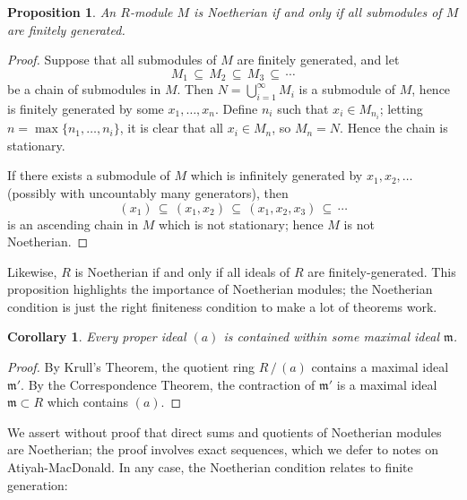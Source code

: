 \documentclass[11pt]{article}
\newtheorem{proposition}{Proposition}
\newtheorem{corollary}{Corollary}
\begin{document}
\begin{adjustwidth}{0.5cm}{}
  \begin{proposition}
    An $R$-module $M$ is Noetherian if and only if all submodules of $M$ are finitely generated.
  \end{proposition}
  \begin{proof}
    Suppose that all submodules of $M$ are finitely generated, and let 
    \[
      M_{1} \, \subseteq \, M_{2} \, \subseteq \, M_{3} \, \subseteq \, \cdots
    \]
    be a chain of submodules in $M$. Then $N = \bigcup_{i = 1}^{\infty} M_{i}$ is a submodule of $M$, hence is finitely generated by some $x_{1}, \ldots, x_{n}$. Define $n_{i}$ such that $x_{i} \in M_{n_{i}}$; letting $n = \max\{ n_{1}, \ldots, n_{i} \}$, it is clear that all $x_{i} \in M_{n}$, so $M_{n} = N$. Hence the chain is stationary.

    If there exists a submodule of $M$ which is infinitely generated by $x_{1}, x_{2}, \ldots$ (possibly with uncountably many generators), then
    \[
      (x_{1}) \, \subseteq \, (x_{1}, x_{2}) \, \subseteq \, (x_{1}, x_{2}, x_{3}) \, \subseteq \, \cdots
    \]
    is an ascending chain in $M$ which is not stationary; hence $M$ is not Noetherian.
  \end{proof}
\end{adjustwidth}

Likewise, $R$ is Noetherian if and only if all ideals of $R$ are finitely-generated. This proposition highlights the importance of Noetherian modules; the Noetherian condition is just the right finiteness condition to make a lot of theorems work.

\begin{adjustwidth}{0.5cm}{}
  \begin{corollary}
    Every proper ideal $(a)$ is contained within some maximal ideal $\mathfrak{m}$.
  \end{corollary}
  \begin{proof}
    By Krull's Theorem, the quotient ring $R \, / \, (a)$ contains a maximal ideal $\mathfrak{m}'$. By the Correspondence Theorem, the contraction of $\mathfrak{m}'$ is a maximal ideal $\mathfrak{m} \subset R$ which contains $(a)$.
  \end{proof}
\end{adjustwidth}

We assert without proof that direct sums and quotients of Noetherian modules are Noetherian; the proof involves exact sequences, which we defer to notes on Atiyah-MacDonald. In any case, the Noetherian condition relates to finite generation:
\end{document}
